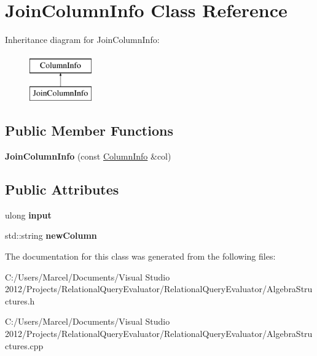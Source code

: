 \hypertarget{class_join_column_info}{\section{Join\+Column\+Info Class Reference}
\label{class_join_column_info}
}
Inheritance diagram for Join\+Column\+Info\+:\begin{figure}[H]
\begin{center}
\leavevmode
\includegraphics[height=2.000000cm]{class_join_column_info}
\end{center}
\end{figure}
\subsection*{Public Member Functions}
\begin{DoxyCompactItemize}
\item 
\hypertarget{class_join_column_info_a87471f04a13b3b2a5ff4bd60065e18d9}{{\bfseries Join\+Column\+Info} (const \hyperlink{class_column_info}{Column\+Info} \&col)}\label{class_join_column_info_a87471f04a13b3b2a5ff4bd60065e18d9}

\end{DoxyCompactItemize}
\subsection*{Public Attributes}
\begin{DoxyCompactItemize}
\item 
\hypertarget{class_join_column_info_a6a87e51d648e21dd6806d7a1bd6191da}{ulong {\bfseries input}}\label{class_join_column_info_a6a87e51d648e21dd6806d7a1bd6191da}

\item 
\hypertarget{class_join_column_info_a4fdb28a84e69012cdb314463f9c0d674}{std\+::string {\bfseries new\+Column}}\label{class_join_column_info_a4fdb28a84e69012cdb314463f9c0d674}

\end{DoxyCompactItemize}


The documentation for this class was generated from the following files\+:\begin{DoxyCompactItemize}
\item 
C\+:/\+Users/\+Marcel/\+Documents/\+Visual Studio 2012/\+Projects/\+Relational\+Query\+Evaluator/\+Relational\+Query\+Evaluator/Algebra\+Structures.\+h\item 
C\+:/\+Users/\+Marcel/\+Documents/\+Visual Studio 2012/\+Projects/\+Relational\+Query\+Evaluator/\+Relational\+Query\+Evaluator/Algebra\+Structures.\+cpp\end{DoxyCompactItemize}
